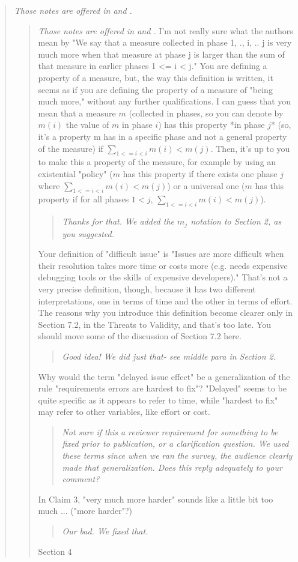 \begin{quote}{\em 
Those notes are offered in  and .}
\begin{quote}{\em 
Those notes are offered in  and .}
I'm not really sure what the authors mean by "We say that a
measure collected in phase 1, ., i, .. j is very much more
when that measure at phase j is larger than the sum of that
measure in earlier phases 1 <= i < j." You are defining a
property of a measure, but, the way this definition is
written, it seems as if you are defining the property of a
measure of "being much more," without any further
qualifications.  I can guess that you mean that a measure
$m$ (collected in phases, so you can denote by $m(i)$ the
value of $m$ in phase $i$) has this property *in phase $j$*
(so, it's a property m has in a specific phase and not a
general property of the measure) if $\sum_{1 <= i < i} m(i)
< m(j)$. Then, it's up to you to make this a property of the
measure, for example by using an existential "policy" ($m$
has this property if there exists one phase $j$ where
$\sum_{1 <= i < i} m(i) < m(j)$) or a universal one ($m$ has
this property if for all phases $1<j$, $\sum_{1 <= i < i}
m(i) < m(j)$).
\begin{quote}{\em
Thanks for that. We added the $m_j$ notation to Section 2, as you suggested.
 }\end{quote}
 
 
Your definition of "difficult issue" is "Issues are more
difficult when their resolution takes more time or costs
more (e.g. needs expensive debugging tools or the skills of
expensive developers)." That's not a very precise
definition, though, because it has two different
interpretations, one in terms of time and the other in terms
of effort. The reasons why you introduce this definition
become clearer only in Section 7.2, in the Threats to
Validity, and that's too late. You should move some of the
discussion of Section 7.2 here.
\begin{quote}
{\em Good idea! We did just that- see middle para in Section 2.}
\end{quote}
Why would the term "delayed issue effect" be a
generalization of the rule "requirements errors are hardest
to fix"? "Delayed" seems to be quite specific as it appears
to refer to time, while "hardest to fix" may refer to other
variables, like effort or cost.
\begin{quote}
{\em Not sure if this a reviewer requirement for something to be fixed
prior to publication, or a clarification question. We used these
terms since when we ran the survey, the audience clearly made
that generalization. Does this reply adequately to your comment?}
\end{quote}
In Claim 3, "very much more harder" sounds like a
little bit too much ... ("more harder"?)
\begin{quote}
{\em Our bad. We fixed that.}
\end{quote}
Section 4


\end{quote}
\end{quote}
